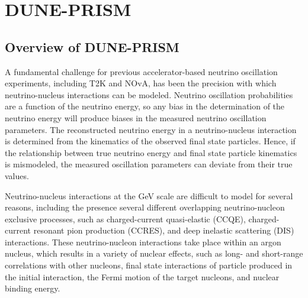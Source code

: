 \chapter{DUNE-PRISM}
\label{ch:prism}

\section{Overview of DUNE-PRISM}
\label{sec:prism-ovvw}

A fundamental challenge for previous accelerator-based neutrino oscillation experiments, including T2K and NOvA, has been the precision with which neutrino-nucleus interactions can be modeled. Neutrino oscillation probabilities are a function of the neutrino energy, so any bias in the determination of the neutrino energy will produce biases in the measured neutrino oscillation parameters. The reconstructed neutrino energy in a neutrino-nucleus interaction is determined from the kinematics of the observed final state particles. Hence, if the relationship between true neutrino energy and final state particle kinematics is mismodeled, the measured oscillation parameters can deviate from their true values.



Neutrino-nucleus interactions at the GeV scale are difficult to model for several reasons, including the presence several different overlapping neutrino-nucleon exclusive processes, such as charged-current quasi-elastic (CCQE), charged-current resonant pion production (CCRES), and deep inelastic scattering (DIS) interactions. These neutrino-nucleon interactions take place within an argon nucleus, which results in a variety of nuclear effects, such as long- and short-range correlations with other nucleons, final state interactions of particle produced in the initial interaction, the Fermi motion of the target nucleons, and nuclear binding energy.

